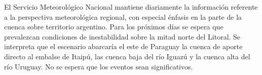 El Servicio Meteorológico Nacional mantiene diariamente la información
referente a la perspectiva meteorológica regional, con especial énfasis
en la parte de la cuenca sobre territorio argentino. Para los próximos
días se espera que prevalezcan condiciones de inestabilidad sobre la
mitad norte del Litoral. Se interpreta que el escenario abarcaría el
este de Paraguay la cuenca de aporte directo al embalse de Itaipú, las
cuenca baja del río Iguazú y la cuenca alta del río Uruguay. No se
espera que los eventos sean significativos.
